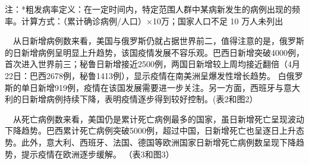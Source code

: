 \documentclass[
]{article}
\begin{document}
\begin{table}[H]
\begin{table}[H]
\endgroup{}
\end{table} \begin{tablenotes}
        \fontsize{15}{15}
        \selectfont
        \item 注：*粗发病率定义：在一定时间内，特定范围人群中某病新发生的病例出现的频率。计算方式：（累计确诊病例/人口）×10万；国家人口不足 10 万人未列出 %
      \end{tablenotes}
\end{table}

\(\quad\)从日新增病例数来看，美国与俄罗斯仍就占据世界前二，值得注意的是，俄罗斯的日新增病例呈明显上升趋势，该国疫情发展不容乐观。巴西日新增突破4000例，首次进入世界前三；秘鲁日新增接近2500例，两国日新增较上周均接近翻倍（4月22日：巴西2678例，秘鲁1413例），显示疫情在南美洲呈爆发性增长趋势。
白俄罗斯的单日新增919例，疫情在该国发展需要进一步关注。另一方面，西班牙与意大利的日新增病例持续下降，表明疫情逐步得到较好控制。(表2和图2）

\(\quad\)从死亡病例数来看，美国仍是累计死亡病例最多的国家，虽日新增死亡呈现波动下降趋势。巴西累计死亡病例突破5000例，超过中国，日新增死亡也呈逐日上升态势。此外，意大利、西班牙、法国、德国等欧洲国家日新增死亡病例数呈现下降趋势，提示疫情在欧洲逐步缓解。
（表3和图3）
\end{document}
